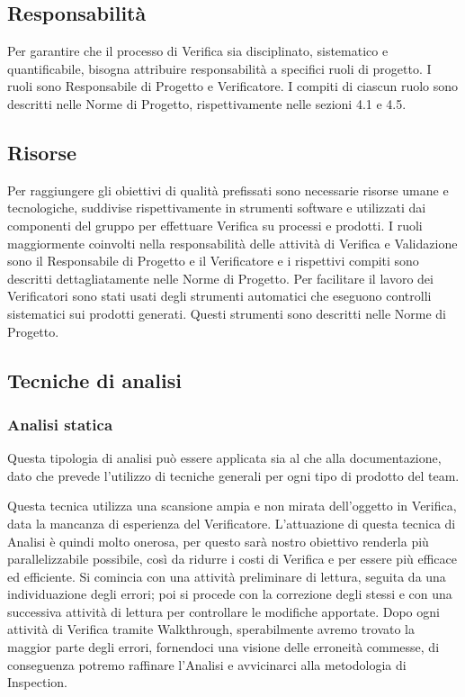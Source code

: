 \subsection{Responsabilità} %
\label{2.6}
Per garantire che il processo di Verifica sia disciplinato, sistematico e quantificabile, bisogna attribuire responsabilità a specifici ruoli di progetto. I ruoli sono Responsabile di Progetto e Verificatore. I compiti di ciascun ruolo sono descritti nelle Norme di Progetto, rispettivamente nelle sezioni 4.1 e 4.5.

\subsection{Risorse} %
\label{2.7}
Per raggiungere gli obiettivi di qualità prefissati sono necessarie risorse umane e tecnologiche, suddivise rispettivamente in strumenti software e  utilizzati dai componenti del gruppo per effettuare Verifica su processi e prodotti. I ruoli maggiormente coinvolti nella responsabilità delle attività di Verifica e Validazione sono il Responsabile di Progetto e il Verificatore e i rispettivi compiti sono descritti dettagliatamente nelle Norme di Progetto. Per facilitare il lavoro dei Verificatori sono stati usati degli strumenti automatici che eseguono controlli sistematici sui prodotti generati. Questi strumenti sono descritti nelle Norme di Progetto.

\subsection{Tecniche di analisi} %
\label{2.8}

\subsubsection{Analisi statica}
\label{3.1}
Questa tipologia di analisi può essere applicata sia al  che alla documentazione, dato che prevede l'utilizzo di tecniche generali per ogni tipo di prodotto del team.


Questa tecnica utilizza una scansione ampia e non mirata dell'oggetto in Verifica, data la mancanza di esperienza  del Verificatore.
L'attuazione di questa tecnica di Analisi è quindi molto onerosa, per questo sarà nostro obiettivo renderla più parallelizzabile possibile, così da ridurre i costi di Verifica e per essere più efficace ed efficiente.
Si comincia con una attività preliminare di lettura, seguita da una individuazione degli errori; poi si procede con la correzione degli stessi e con una successiva attività di lettura per controllare le modifiche apportate.
Dopo ogni attività di Verifica tramite Walkthrough, sperabilmente avremo trovato la maggior parte degli errori, fornendoci una visione delle erroneità commesse, di conseguenza potremo raffinare l'Analisi e avvicinarci alla metodologia di Inspection.

